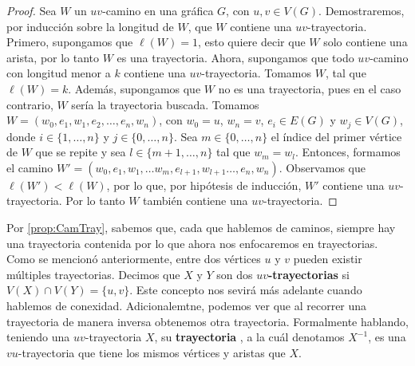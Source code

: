 \begin{proof}
    Sea $W$ un $uv$-camino en una gr\'afica $G$, con $u,v \in V(G)$.
    Demostraremos, por inducci\'on sobre la longitud de $W$, que $W$
    contiene una $uv$-trayectoria. Primero, supongamos que $\ell(W)=1$, esto
    quiere decir que $W$ solo contiene una arista, por lo tanto $W$ es una
    trayectoria. Ahora, supongamos que todo $uv$-camino con longitud menor a
    $k$ contiene una $uv$-trayectoria. Tomamos $W$, tal que $\ell(W) = k$.
    Adem\'as, supongamos que $W$ no es una trayectoria, pues en el caso
    contrario, $W$ ser\'ia la trayectoria buscada. Tomamos $W=
    (w_0,e_1,w_1,e_2, \dots, e_n,w_n)$, con $w_0=u$, $w_n=v$, $e_i \in E(G)$
    y $w_j \in V(G)$, donde $i \in \{1, \dots, n\}$ y $j \in \{0, \dots,
    n\}$. Sea $m \in \{0, \dots, n\}$ el \'indice del primer v\'ertice de
    $W$ que se repite y sea $l \in \{m+1, \dots, n\}$ tal que $w_m = w_l$.
    Entonces, formamos el camino $W'= (w_0,e_1,w_1,\dots w_m, e_{l+1},
    w_{l+1} \dots, e_n,w_n)$. Observamos que $\ell(W')<\ell(W)$, por lo que,
    por hip\'otesis de inducci\'on, $W'$ contiene una $uv$-trayectoria. Por
    lo tanto $W$ tambi\'en contiene una $uv$-trayectoria.
\end{proof}

Por \cref{prop:CamTray}, sabemos que, cada que hablemos de caminos, siempre hay
una trayectoria contenida por lo que ahora nos enfocaremos en trayectorias. Como
se mencion\'o anteriormente, entre dos v\'ertices $u$ y $v$ pueden existir
m\'ultiples trayectorias. Decimos que $X$ y $Y$ son dos \textbf{$uv$-trayectorias}
 si $V(X)\cap V(Y)=\{u,v\}$.
Este concepto nos sevir\'a m\'as adelante cuando hablemos de conexidad.
Adicionalemtne, podemos ver que al recorrer una trayectoria de manera inversa
obtenemos otra trayectoria. Formalmente hablando, teniendo una $uv$-trayectoria
$X$, su \textbf{trayectoria} , a la cu\'al denotamos
$X^{-1}$, es una $vu$-trayectoria que tiene los mismos v\'ertices y aristas que
$X$.


